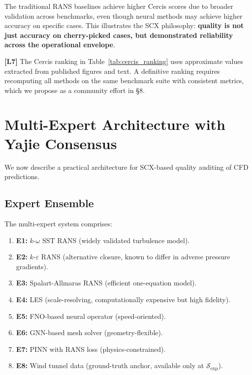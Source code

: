 \documentclass[11pt,a4paper]{article}
\theoremstyle{definition}
\theoremstyle{remark}
\newcommand{\limitationTag}[1]{\textsf{\textbf{[L#1]}}}
\begin{document}
\noindent The traditional RANS baselines achieve higher Cercis scores due to broader validation across benchmarks, even though neural methods may achieve higher accuracy on specific cases.
This illustrates the SCX philosophy: \textbf{quality is not just accuracy on cherry-picked cases, but demonstrated reliability across the operational envelope}.

\limitationTag{7} The Cercis ranking in Table~\ref{tab:cercis_ranking} uses approximate values extracted from published figures and text. A definitive ranking requires recomputing all methods on the same benchmark suite with consistent metrics, which we propose as a community effort in §8.

\section{Multi-Expert Architecture with Yajie Consensus}

We now describe a practical architecture for SCX-based quality auditing of CFD predictions.

\subsection{Expert Ensemble}

The multi-expert system comprises:

\begin{enumerate}[label=\textbf{E\arabic*:}, leftmargin=*]
    \item \textbf{E1:} $k$-$\omega$ SST RANS (widely validated turbulence model).
    \item \textbf{E2:} $k$-$\varepsilon$ RANS (alternative closure, known to differ in adverse pressure gradients).
    \item \textbf{E3:} Spalart-Allmaras RANS (efficient one-equation model).
    \item \textbf{E4:} LES (scale-resolving, computationally expensive but high fidelity).
    \item \textbf{E5:} FNO-based neural operator (speed-oriented).
    \item \textbf{E6:} GNN-based mesh solver (geometry-flexible).
    \item \textbf{E7:} PINN with RANS loss (physics-constrained).
    \item \textbf{E8:} Wind tunnel data (ground-truth anchor, available only at $\mathcal{S}_{\text{exp}}$).
\end{enumerate}
\end{document}
